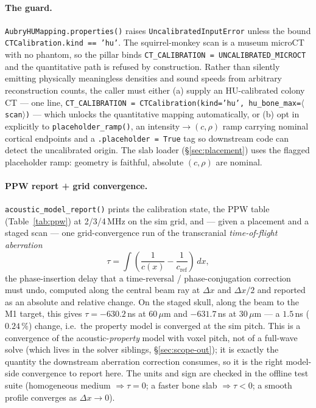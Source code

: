 \documentclass{compactarticle}
\begin{document}
\paragraph{The guard.}
\texttt{AubryHUMapping.properties()} raises
\texttt{UncalibratedInputError} unless the bound
\texttt{CTCalibration.kind == 'hu'}. The squirrel-monkey scan is a
museum microCT with no phantom, so the pillar binds
\texttt{CT\_CALIBRATION = UNCALIBRATED\_MICROCT} and the quantitative
path is refused by construction. Rather than silently emitting
physically meaningless densities and sound speeds from arbitrary
reconstruction counts, the caller must either (a) supply an
HU-calibrated colony CT --- one line,
\texttt{CT\_CALIBRATION = CTCalibration(kind='hu',
hu\_bone\_max=$\langle$scan$\rangle$)} --- which unlocks the
quantitative mapping automatically, or (b) opt in explicitly to
\texttt{placeholder\_ramp()}, an intensity$\to(c,\rho)$ ramp carrying
nominal cortical endpoints and a \texttt{.placeholder = True} tag so
downstream code can detect the uncalibrated origin. The slab loader
(\S\ref{sec:placement}) uses the flagged placeholder ramp: geometry is
faithful, absolute $(c,\rho)$ are nominal.

\paragraph{PPW report + grid convergence.}
\texttt{acoustic\_model\_report()} prints the calibration state, the
PPW table (Table~\ref{tab:ppw}) at 2/3/4\,MHz on the sim grid, and ---
given a placement and a staged scan --- one grid-convergence run of the
transcranial \emph{time-of-flight aberration}
\begin{equation}
\tau = \int \left(\frac{1}{c(x)} - \frac{1}{c_{\text{ref}}}\right)\,dx,
\end{equation}
the phase-insertion delay that a time-reversal / phase-conjugation
correction must undo, computed along the central beam ray at
$\Delta x$ and $\Delta x/2$ and reported as an absolute and relative
change. On the staged skull, along the beam to the M1 target, this
gives $\tau = -630.2$\,ns at $60\,\mu$m and $-631.7$\,ns at $30\,\mu$m
--- a $1.5$\,ns ($0.24\,\%$) change, i.e.\ the property model is
converged at the sim pitch. This is a convergence of the
acoustic-\emph{property} model
with voxel pitch, not of a full-wave solve (which lives in the solver
siblings, \S\ref{sec:scope-out}); it is exactly the quantity the
downstream aberration correction consumes, so it is the right
model-side convergence to report here. The units and sign are checked
in the offline test suite (homogeneous medium $\Rightarrow \tau = 0$;
a faster bone slab $\Rightarrow \tau < 0$; a smooth profile converges
as $\Delta x \to 0$).
\end{document}
